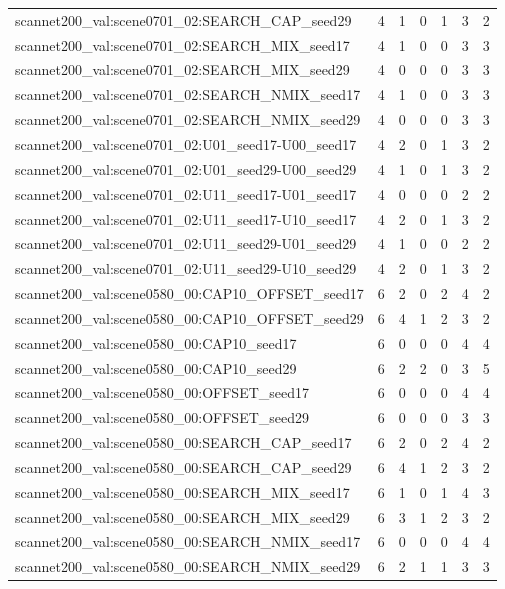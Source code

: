 \begin{table}[t]
\begin{tabular}{lrrrrrr}
scannet200\_val:scene0701\_02:SEARCH\_CAP\_seed29 & 4 & 1 & 0 & 1 & 3 & 2 \\
scannet200\_val:scene0701\_02:SEARCH\_MIX\_seed17 & 4 & 1 & 0 & 0 & 3 & 3 \\
scannet200\_val:scene0701\_02:SEARCH\_MIX\_seed29 & 4 & 0 & 0 & 0 & 3 & 3 \\
scannet200\_val:scene0701\_02:SEARCH\_NMIX\_seed17 & 4 & 1 & 0 & 0 & 3 & 3 \\
scannet200\_val:scene0701\_02:SEARCH\_NMIX\_seed29 & 4 & 0 & 0 & 0 & 3 & 3 \\
scannet200\_val:scene0701\_02:U01\_seed17-U00\_seed17 & 4 & 2 & 0 & 1 & 3 & 2 \\
scannet200\_val:scene0701\_02:U01\_seed29-U00\_seed29 & 4 & 1 & 0 & 1 & 3 & 2 \\
scannet200\_val:scene0701\_02:U11\_seed17-U01\_seed17 & 4 & 0 & 0 & 0 & 2 & 2 \\
scannet200\_val:scene0701\_02:U11\_seed17-U10\_seed17 & 4 & 2 & 0 & 1 & 3 & 2 \\
scannet200\_val:scene0701\_02:U11\_seed29-U01\_seed29 & 4 & 1 & 0 & 0 & 2 & 2 \\
scannet200\_val:scene0701\_02:U11\_seed29-U10\_seed29 & 4 & 2 & 0 & 1 & 3 & 2 \\
scannet200\_val:scene0580\_00:CAP10\_OFFSET\_seed17 & 6 & 2 & 0 & 2 & 4 & 2 \\
scannet200\_val:scene0580\_00:CAP10\_OFFSET\_seed29 & 6 & 4 & 1 & 2 & 3 & 2 \\
scannet200\_val:scene0580\_00:CAP10\_seed17 & 6 & 0 & 0 & 0 & 4 & 4 \\
scannet200\_val:scene0580\_00:CAP10\_seed29 & 6 & 2 & 2 & 0 & 3 & 5 \\
scannet200\_val:scene0580\_00:OFFSET\_seed17 & 6 & 0 & 0 & 0 & 4 & 4 \\
scannet200\_val:scene0580\_00:OFFSET\_seed29 & 6 & 0 & 0 & 0 & 3 & 3 \\
scannet200\_val:scene0580\_00:SEARCH\_CAP\_seed17 & 6 & 2 & 0 & 2 & 4 & 2 \\
scannet200\_val:scene0580\_00:SEARCH\_CAP\_seed29 & 6 & 4 & 1 & 2 & 3 & 2 \\
scannet200\_val:scene0580\_00:SEARCH\_MIX\_seed17 & 6 & 1 & 0 & 1 & 4 & 3 \\
scannet200\_val:scene0580\_00:SEARCH\_MIX\_seed29 & 6 & 3 & 1 & 2 & 3 & 2 \\
scannet200\_val:scene0580\_00:SEARCH\_NMIX\_seed17 & 6 & 0 & 0 & 0 & 4 & 4 \\
scannet200\_val:scene0580\_00:SEARCH\_NMIX\_seed29 & 6 & 2 & 1 & 1 & 3 & 3 \\

\end{tabular}
\end{table}
